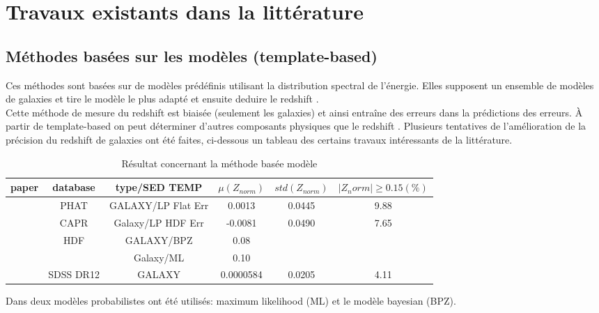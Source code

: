 
\chapter{Travaux existants dans la littérature}
\section{Méthodes basées sur les modèles (template-based)}
Ces méthodes sont basées sur de modèles prédéfinis utilisant la distribution spectral de l'énergie. Elles supposent un ensemble de modèles de galaxies et tire le modèle le plus adapté et ensuite deduire le redshift \cite{Narciso, Gabriel, photoSED}.\\ 
Cette méthode de mesure du redshift est biaisée (seulement les galaxies) et ainsi entraîne des erreurs dans la prédictions des erreurs. À partir de template-based on peut déterminer d'autres composants physiques que le redshift \cite{meuphirim}. Plusieurs tentatives de l'amélioration de la précision du redshift de galaxies ont été faites, ci-dessous un tableau des certains travaux intéressants de la littérature.
\begin{table}[!ht]
\centering    
\begin{tabular}{|c|c|c|c|c|c|}
    \hline paper & database & type/SED TEMP & $\mu(Z_{norm})$ & $std(Z_{norm})$ & $|Z_norm|\ge0.15 (\%)$\\
    \hline 
    \multirow{2}{1cm}{\cite{sql}} & PHAT & GALAXY/LP Flat Err & 0.0013 & 0.0445 & 9.88  \\
    \cline{2-6}
     & CAPR & Galaxy/LP HDF Err & -0.0081 & 0.0490 & 7.65\\
    \hline
    \multirow{2}{1cm}{\cite{Narciso}} & \multirow{2}{1cm}{HDF} & GALAXY/BPZ & 0.08 & &  \\
    \cline{3-6} 
     &  & Galaxy/ML & 0.10 &  & \\
    \hline
    \cite{photoredSDSS} & SDSS DR12 & GALAXY & 0.0000584 & 0.0205& 4.11\\
    \hline
    
    
    
\end{tabular}
    \caption{Résultat concernant la méthode basée modèle}
    \label{base_model}
\end{table}

Dans \cite{Narciso} deux modèles probabilistes ont été utilisés: maximum likelihood (ML) et le modèle bayesian (BPZ). 

